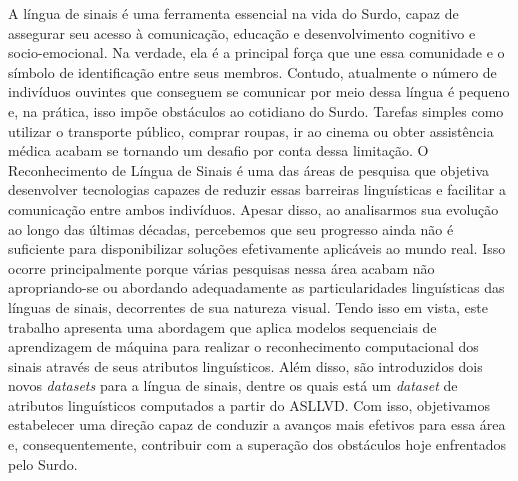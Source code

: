 \begin{resumo}[Resumo]
  \noindent
  A língua de sinais é uma ferramenta essencial na vida do Surdo, capaz de assegurar seu acesso à comunicação, educação e desenvolvimento cognitivo e socio-emocional.
  Na verdade, ela é a principal força que une essa comunidade e o símbolo de identificação entre seus membros.
  Contudo, atualmente o número de indivíduos ouvintes que conseguem se comunicar por meio dessa língua é pequeno e, na prática, isso impõe obstáculos ao cotidiano do Surdo.
  Tarefas simples como utilizar o transporte público, comprar roupas, ir ao cinema ou obter assistência médica acabam se tornando um desafio por conta dessa limitação.
  O Reconhecimento de Língua de Sinais é uma das áreas de pesquisa que objetiva desenvolver tecnologias capazes de reduzir essas barreiras linguísticas e facilitar a comunicação entre ambos indivíduos.
  Apesar disso, ao analisarmos sua evolução ao longo das últimas décadas, percebemos que seu progresso ainda não é suficiente para disponibilizar soluções efetivamente aplicáveis ao mundo real.
  Isso ocorre principalmente porque várias pesquisas nessa área acabam não apropriando-se ou abordando adequadamente as particularidades linguísticas das línguas de sinais, decorrentes de sua natureza visual.
  Tendo isso em vista, este trabalho apresenta uma abordagem que aplica modelos sequenciais de aprendizagem de máquina para realizar o reconhecimento computacional dos sinais através de seus atributos linguísticos. Além disso, são introduzidos dois novos \textit{datasets} para a língua de sinais, dentre os quais está um \textit{dataset} de atributos linguísticos computados a partir do ASLLVD.
  Com isso, objetivamos estabelecer uma direção capaz de conduzir a avanços mais efetivos para essa área e, consequentemente, contribuir com a superação dos obstáculos hoje enfrentados pelo Surdo.





\end{resumo}
